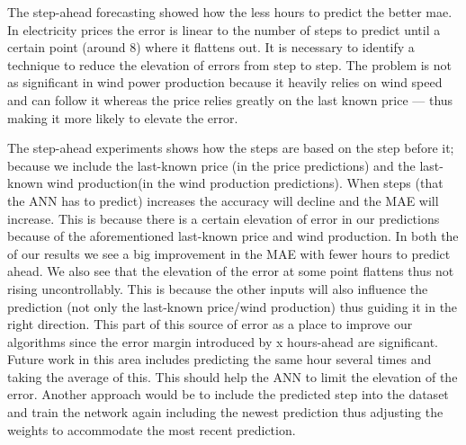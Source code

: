 The step-ahead forecasting showed how the less hours to predict the better mae. In electricity prices the error is linear to the number of steps to predict until a certain point (around 8) where it flattens out. It is necessary to identify a technique to reduce the elevation of errors from step to step. The problem is not as significant in wind power production because it heavily relies on wind speed and can follow it whereas the price relies greatly on the last known price --- thus making it more likely to elevate the error. 

The step-ahead experiments shows how the steps are based on the step before it; because we include the last-known price (in the price predictions) and the last-known wind production(in the wind production predictions). When steps (that the ANN has to predict) increases the accuracy will decline and the MAE will increase. This is because there is a certain elevation of error in our predictions because of the aforementioned last-known price and wind production. In both the of our results we see a big improvement in the MAE with fewer hours to predict ahead. We also see that the elevation of the error at some point flattens thus not rising uncontrollably. This is because the other inputs will also influence the prediction (not only the last-known price/wind production) thus guiding it in the right direction. This part of this source of error as a place to improve our algorithms since the error margin introduced by x hours-ahead are significant. Future work in this area includes predicting the same hour several times and taking the average of this. This should help the ANN to limit the elevation of the error. Another approach would be to include the predicted step into the dataset and train the network again including the newest prediction thus adjusting the weights to accommodate the most recent prediction.

